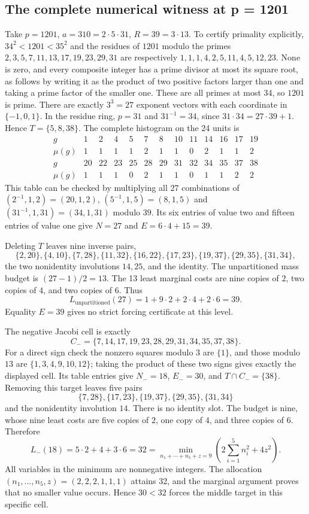 \subsection{The complete numerical witness at p = 1201}
Take $p=1201$, $a=310=2\cdot5\cdot31$, $R=39=3\cdot13$.
To certify primality explicitly, $34^2<1201<35^2$ and the residues
of $1201$ modulo the primes $2,3,5,7,11,13,17,19,23,29,31$ are
respectively $1,1,1,4,2,5,11,4,5,12,23$. None is zero, and every
composite integer has a prime divisor at most its square root, as
follows by writing it as the product of two positive factors larger
than one and taking a prime factor of the smaller one. These are
all primes at most 34, so $1201$ is prime.
There are exactly $3^3=27$ exponent vectors with each coordinate
in $\{-1,0,1\}$. In the residue ring, $p=31$ and $31^{-1}=34$,
since $31\cdot34=27\cdot39+1$. Hence $T=\{5,8,38\}$.
The complete histogram on the 24 units is
\[
\begin{array}{c|rrrrrrrrrrrr}
g&1&2&4&5&7&8&10&11&14&16&17&19\\\hline
\mu(g)&1&1&1&1&2&1&1&0&2&1&1&2\\[2pt]
g&20&22&23&25&28&29&31&32&34&35&37&38\\\hline
\mu(g)&1&1&1&0&2&1&1&0&1&1&2&2
\end{array}
\]
This table can be checked by multiplying all 27 combinations of
$(2^{-1},1,2)=(20,1,2)$, $(5^{-1},1,5)=(8,1,5)$ and
$(31^{-1},1,31)=(34,1,31)$ modulo $39$. Its six entries of value
two and fifteen entries of value one give $N=27$ and $E=6\cdot4+15=39$.

Deleting $T$ leaves nine inverse pairs,
\[
 \{2,20\},\{4,10\},\{7,28\},\{11,32\},\{16,22\},
 \{17,23\},\{19,37\},\{29,35\},\{31,34\},
\]
the two nonidentity involutions $14,25$, and the identity. The
unpartitioned mass budget is $(27-1)/2=13$. The 13 least marginal
costs are nine copies of $2$, two copies of $4$, and two copies of
$6$. Thus
\[
 L_{\mathrm{unpartitioned}}(27)=1+9\cdot2+2\cdot4+2\cdot6=39.
\]
Equality $E=39$ gives no strict forcing certificate at this level.

The negative Jacobi cell is exactly
\[
 C_- =\{7,14,17,19,23,28,29,31,34,35,37,38\}.
\]
For a direct sign check the nonzero squares modulo $3$ are $\{1\}$,
and those modulo $13$ are $\{1,3,4,9,10,12\}$; taking the product
of these two signs gives exactly the displayed cell. Its table entries
give $N_-=18$, $E_-=30$, and $T\cap C_-=\{38\}$.
Removing this target leaves five pairs
\[
 \{7,28\},\{17,23\},\{19,37\},\{29,35\},\{31,34\}
\]
and the nonidentity involution $14$. There is no identity slot.
The budget is nine, whose nine least costs are five copies of $2$,
one copy of $4$, and three copies of $6$. Therefore
\[
 L_-(18)=5\cdot2+4+3\cdot6=32
 =\min_{n_1+\cdots+n_5+z=9}
       \left(2\sum_{i=1}^5 n_i^2+4z^2\right).
\]
All variables in the minimum are nonnegative integers. The allocation
$(n_1,\ldots,n_5,z)=(2,2,2,1,1,1)$ attains 32, and the marginal
argument proves that no smaller value occurs. Hence $30<32$ forces
the middle target in this specific cell.

